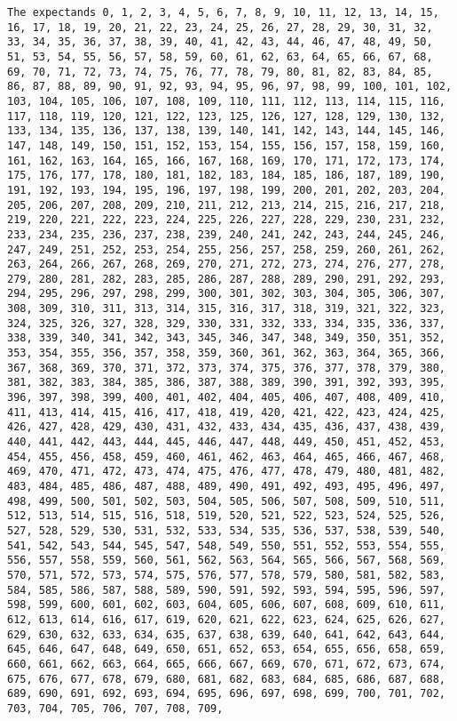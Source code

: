 \documentclass[
  letterpaper,
  DIV=11,
  numbers=noendperiod]{scrartcl}
\begin{document}
\begin{verbatim}
The expectands 0, 1, 2, 3, 4, 5, 6, 7, 8, 9, 10, 11, 12, 13, 14, 15, 16, 17, 18, 19, 20, 21, 22, 23, 24, 25, 26, 27, 28, 29, 30, 31, 32, 33, 34, 35, 36, 37, 38, 39, 40, 41, 42, 43, 44, 46, 47, 48, 49, 50, 51, 53, 54, 55, 56, 57, 58, 59, 60, 61, 62, 63, 64, 65, 66, 67, 68, 69, 70, 71, 72, 73, 74, 75, 76, 77, 78, 79, 80, 81, 82, 83, 84, 85, 86, 87, 88, 89, 90, 91, 92, 93, 94, 95, 96, 97, 98, 99, 100, 101, 102, 103, 104, 105, 106, 107, 108, 109, 110, 111, 112, 113, 114, 115, 116, 117, 118, 119, 120, 121, 122, 123, 125, 126, 127, 128, 129, 130, 132, 133, 134, 135, 136, 137, 138, 139, 140, 141, 142, 143, 144, 145, 146, 147, 148, 149, 150, 151, 152, 153, 154, 155, 156, 157, 158, 159, 160, 161, 162, 163, 164, 165, 166, 167, 168, 169, 170, 171, 172, 173, 174, 175, 176, 177, 178, 180, 181, 182, 183, 184, 185, 186, 187, 189, 190, 191, 192, 193, 194, 195, 196, 197, 198, 199, 200, 201, 202, 203, 204, 205, 206, 207, 208, 209, 210, 211, 212, 213, 214, 215, 216, 217, 218, 219, 220, 221, 222, 223, 224, 225, 226, 227, 228, 229, 230, 231, 232, 233, 234, 235, 236, 237, 238, 239, 240, 241, 242, 243, 244, 245, 246, 247, 249, 251, 252, 253, 254, 255, 256, 257, 258, 259, 260, 261, 262, 263, 264, 266, 267, 268, 269, 270, 271, 272, 273, 274, 276, 277, 278, 279, 280, 281, 282, 283, 285, 286, 287, 288, 289, 290, 291, 292, 293, 294, 295, 296, 297, 298, 299, 300, 301, 302, 303, 304, 305, 306, 307, 308, 309, 310, 311, 313, 314, 315, 316, 317, 318, 319, 321, 322, 323, 324, 325, 326, 327, 328, 329, 330, 331, 332, 333, 334, 335, 336, 337, 338, 339, 340, 341, 342, 343, 345, 346, 347, 348, 349, 350, 351, 352, 353, 354, 355, 356, 357, 358, 359, 360, 361, 362, 363, 364, 365, 366, 367, 368, 369, 370, 371, 372, 373, 374, 375, 376, 377, 378, 379, 380, 381, 382, 383, 384, 385, 386, 387, 388, 389, 390, 391, 392, 393, 395, 396, 397, 398, 399, 400, 401, 402, 404, 405, 406, 407, 408, 409, 410, 411, 413, 414, 415, 416, 417, 418, 419, 420, 421, 422, 423, 424, 425, 426, 427, 428, 429, 430, 431, 432, 433, 434, 435, 436, 437, 438, 439, 440, 441, 442, 443, 444, 445, 446, 447, 448, 449, 450, 451, 452, 453, 454, 455, 456, 458, 459, 460, 461, 462, 463, 464, 465, 466, 467, 468, 469, 470, 471, 472, 473, 474, 475, 476, 477, 478, 479, 480, 481, 482, 483, 484, 485, 486, 487, 488, 489, 490, 491, 492, 493, 495, 496, 497, 498, 499, 500, 501, 502, 503, 504, 505, 506, 507, 508, 509, 510, 511, 512, 513, 514, 515, 516, 518, 519, 520, 521, 522, 523, 524, 525, 526, 527, 528, 529, 530, 531, 532, 533, 534, 535, 536, 537, 538, 539, 540, 541, 542, 543, 544, 545, 547, 548, 549, 550, 551, 552, 553, 554, 555, 556, 557, 558, 559, 560, 561, 562, 563, 564, 565, 566, 567, 568, 569, 570, 571, 572, 573, 574, 575, 576, 577, 578, 579, 580, 581, 582, 583, 584, 585, 586, 587, 588, 589, 590, 591, 592, 593, 594, 595, 596, 597, 598, 599, 600, 601, 602, 603, 604, 605, 606, 607, 608, 609, 610, 611, 612, 613, 614, 616, 617, 619, 620, 621, 622, 623, 624, 625, 626, 627, 629, 630, 632, 633, 634, 635, 637, 638, 639, 640, 641, 642, 643, 644, 645, 646, 647, 648, 649, 650, 651, 652, 653, 654, 655, 656, 658, 659, 660, 661, 662, 663, 664, 665, 666, 667, 669, 670, 671, 672, 673, 674, 675, 676, 677, 678, 679, 680, 681, 682, 683, 684, 685, 686, 687, 688, 689, 690, 691, 692, 693, 694, 695, 696, 697, 698, 699, 700, 701, 702, 703, 704, 705, 706, 707, 708, 709, 
\end{verbatim}
\end{document}
